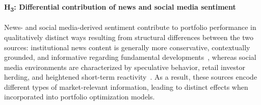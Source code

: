 \paragraph{H\textsubscript{3}: Differential contribution of news and social media sentiment} News- and social media-derived sentiment contribute to portfolio performance in qualitatively distinct ways resulting from structural differences between the two sources: institutional news content is generally more conservative, contextually grounded, and informative regarding fundamental developments~\cite{93d76, 0f204}, whereas social media environments are characterized by speculative behavior, retail investor herding, and heightened short-term reactivity~\cite{cc28c, 34309}. As a result, these sources encode different types of market-relevant information, leading to distinct effects when incorporated into portfolio optimization models.

